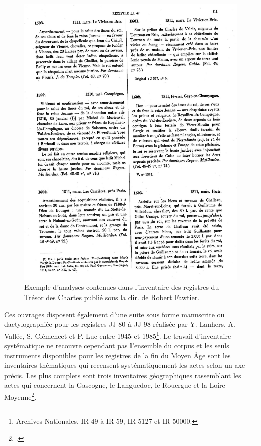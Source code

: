 \documentclass[a4paper,12pt,twoside]{book}
\begin{document}
	\begin{figure}
		\centering
		\includegraphics[width=\textwidth]{Images/Inventaire_papier.jpg}
		\caption{Exemple d'analyses contenues dans l'inventaire des registres du Trésor des Chartes publié sous la dir. de Robert Fawtier.}
		\label{inventaire_papier}
	\end{figure}
	
	Ces ouvrages disposent également d'une suite sous forme manuscrite ou dactylographiée pour les registres JJ 80 à JJ 98 réalisée par Y. Lanhers, A. Vallée, S. Clémencet et P. Luc entre 1945 et 1985\footnote{Archives Nationales, IR 49 à IR 59, IR 5127 et IR 50000.}. Le travail d'inventaire systématique ne recouvre cependant pas l'ensemble du corpus et les seuls instruments disponibles pour les registres de la fin du Moyen Âge sont les inventaires thématiques qui recensent systématiquement les actes selon un axe précis. Les plus complets sont trois inventaires géographiques rassemblant les actes qui concernent la Gascogne, le Languedoc, le Rouergue et la Loire Moyenne\footcite{samaran_gascogne_1966, dossat_languedoc_1983, chevalier_les_1993}.
	
\end{document}
